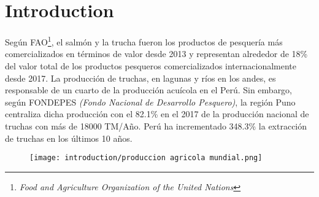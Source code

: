 \chapter*{\centering \large Introduction} 

Según FAO\footnote{\textit{Food and Agriculture Organization of the United Nations}}, el salmón y la trucha fueron los productos de pesquería más comercializados en términos de valor desde 2013 y representan alrededor de 18\% del valor total de los productos pesqueros comercializados internacionalmente desde 2017. \cite{FAO2017} La producción de truchas, en lagunas y ríos en los andes, es responsable de un cuarto de la producción acuícola en el Perú. \cite{SeafoodTradeIntelligencePortal2018} Sin embargo, según FONDEPES \textit{(Fondo Nacional de Desarrollo Pesquero)}, la región Puno centraliza dicha producción con el 82.1\% en el 2017 de la producción nacional de truchas con más de 18000 TM/Año. \cite{FONDEPES2014} Perú ha incrementado 348.3\% la extracción de truchas en los últimos 10 años. \cite{MinisteriodelaProducciondelPeru2018}

  \vspace{1.5cm}
\begin{figure}[H]
	\centering
	\texttt{[image: introduction/produccion agricola mundial.png]}
\end{figure}
